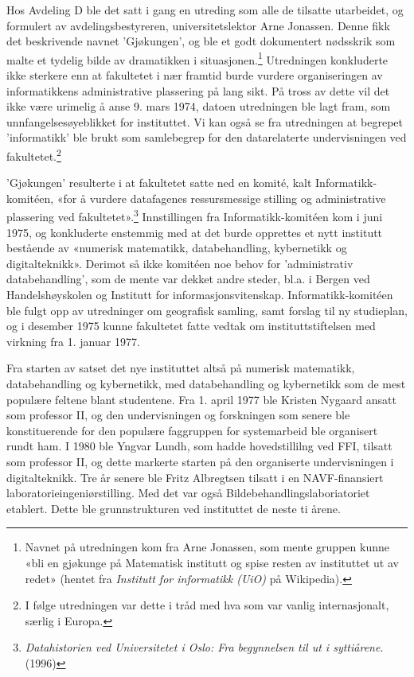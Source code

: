 Hos Avdeling D ble det satt i gang en utreding som alle de tilsatte utarbeidet, og formulert av avdelingsbestyreren, universitetslektor Arne Jonassen. Denne fikk det beskrivende navnet 'Gjøkungen', og ble et godt dokumentert nødsskrik som malte et tydelig bilde av dramatikken i situasjonen.\footnote{Navnet på utredningen kom fra Arne Jonassen, som mente gruppen kunne «bli en gjøkunge på Matematisk institutt og spise resten av instituttet ut av redet» (hentet fra \textit{Institutt for informatikk (UiO)} på Wikipedia).} Utredningen konkluderte ikke sterkere enn at fakultetet i nær framtid burde vurdere organiseringen av informatikkens administrative plassering på lang sikt. På tross av dette vil det ikke være urimelig å anse 9. mars 1974, datoen utredningen ble lagt fram, som unnfangelsesøyeblikket for instituttet. Vi kan også se fra utredningen at begrepet 'informatikk' ble brukt som samlebegrep for den datarelaterte undervisningen ved fakultetet.\footnote{I følge utredningen var dette i tråd med hva som var vanlig internasjonalt, særlig i Europa.}

'Gjøkungen' resulterte i at fakultetet satte ned en komité, kalt Informatikk-komitéen, «for å vurdere datafagenes ressursmessige stilling og administrative plassering ved fakultetet».\footnote{\textit{Datahistorien ved Universitetet i Oslo: Fra begynnelsen til ut i syttiårene.} (1996)} Innstillingen fra Informatikk-komitéen kom i juni 1975, og konkluderte enstemmig med at det burde opprettes et nytt institutt bestående av «numerisk matematikk, databehandling, kybernetikk og digitalteknikk». Derimot så ikke komitéen noe behov for 'administrativ databehandling', som de mente var dekket andre steder, bl.a. i Bergen ved Handelshøyskolen og Institutt for informasjonsvitenskap. Informatikk-komitéen ble fulgt opp av utredninger om geografisk samling, samt forslag til ny studieplan, og i desember 1975 kunne fakultetet fatte vedtak om instituttstiftelsen med virkning fra 1. januar 1977.

Fra starten av satset det nye instituttet altså på numerisk matematikk, databehandling og kybernetikk, med databehandling og kybernetikk som de mest populære feltene blant studentene. Fra 1. april 1977 ble Kristen Nygaard ansatt som professor II, og den undervisningen og forskningen som senere ble konstituerende for den populære faggruppen for systemarbeid ble organisert rundt ham. I 1980 ble Yngvar Lundh, som hadde hovedstillilng ved FFI, tilsatt som professor II, og dette markerte starten på den organiserte undervisningen i digitalteknikk. Tre år senere ble Fritz Albregtsen tilsatt i en NAVF-finansiert laboratorieingeniørstilling. Med det var også Bildebehandlingslaboriatoriet etablert. Dette ble grunnstrukturen ved instituttet de neste ti årene.

